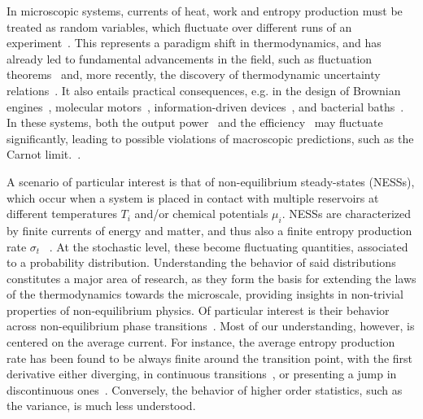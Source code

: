 \documentclass[aps,pre,reprint, amsmath, amssymb,superscriptaddress]{revtex4-1}
\begin{document}
In microscopic systems, currents of heat, work and entropy production must be treated as random variables, which fluctuate over different runs of an experiment~\cite{Seifert2012,RITORT2007528}. 
This represents a paradigm shift in thermodynamics, and has already led to fundamental advancements in the field, such as fluctuation theorems~\cite{Evans1993,Gallavotti1995,Jarzynski1997,Crooks1998,Esposito2009,Campisi2011} and, more
recently, the discovery of thermodynamic uncertainty relations~\cite{Barato2015,Pietzonka2015,Gingrich2016,Pietzonka2017a,Pietzonka2017}.
It also entails practical consequences, e.g.  in the design of Brownian engines~\cite{martinez2016brownian, blickle2012realization, proesmans2016brownian, quinto2014microscopic}, molecular motors~\cite{kinosita2000rotary,lieprl,liepre, lau2007nonequilibrium}, information-driven  devices~\cite{koski2014experimental,toyabe2010experimental}, and bacterial  baths~\cite{krishnamurthy2016micrometre}.
In these systems,  both the output power~\cite{Pietzonka2018,denzler2020power} and the efficiency~\cite{Verley2014a, verley2014universal, polettini2015efficiency,PhysRevResearch.2.032062} may fluctuate significantly, leading to possible violations of macroscopic predictions, such as the Carnot limit.~\cite{martinez2016brownian}.


A scenario of particular interest is that of non-equilibrium steady-states (NESSs), which occur when a system is placed in contact with multiple reservoirs at different temperatures $T_i$ and/or chemical potentials $\mu_i$.
NESSs are characterized by finite currents of energy and matter, and thus also a finite entropy production rate $\sigma_t$ ~\cite{Esposito2010d,VandenBroeck2010,Seifert2012,PhysRevE.82.021120,PhysRevE.91.042140}.
At the stochastic level, these become  fluctuating quantities, associated to a probability distribution.
Understanding the behavior of  said distributions constitutes a major area of research, as they form the  basis for extending the laws of the thermodynamics towards the microscale, 
providing insights in non-trivial properties of non-equilibrium physics.
Of particular interest is their behavior across non-equilibrium phase transitions~\cite{Marro1999}. 
Most of our understanding, however, is centered on the average current. 
For instance, the average entropy production rate has been found to be always finite around the transition point, with the first derivative either diverging, in continuous transitions~\cite{Tome2012,Shim2016,Crochik2005,Zhang2016,Noa2019,Herpich2019,PhysRevResearch.2.013136}, or presenting a jump in discontinuous ones~\cite{Zhang2016,Noa2019,Herpich2018}.
Conversely, the behavior of higher order statistics, such as the variance, is much less understood. 
\end{document}
